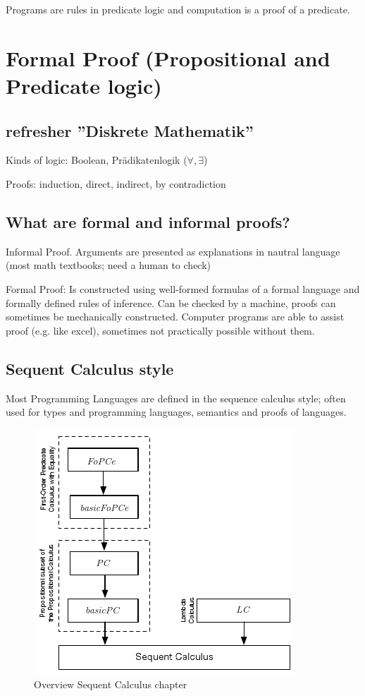 Programs are rules in predicate logic and computation is a proof of a predicate.



\section{Formal Proof (Propositional and Predicate logic)}

\subsection{refresher ''Diskrete Mathematik''}
Kinds of logic: Boolean, Prädikatenlogik ($\forall,\exists$) %

Proofs: induction, direct, indirect, by contradiction

\subsection{What are formal and informal proofs?}
Informal Proof. Arguments are presented as explanations in nautral language (most math textbooks; need a human to check)

Formal Proof: Is constructed using well-formed formulas of a formal language and formally defined rules of inference.
 Can be checked by a machine, proofs can sometimes be mechanically constructed. Computer programs are able to assist proof (e.g. like excel), sometimes not practically possible without them.

\subsection{Sequent Calculus style}

Most Programming Languages are defined in the sequence calculus style; often used for types and programming languages, semantics and proofs of languages.

\begin{figure}
\centering
\includegraphics[width=0.7\linewidth]{images/sequent_calculus_overview}
\caption{Overview Sequent Calculus chapter}
\label{fig:sequentcalculusoverview}
\end{figure}

